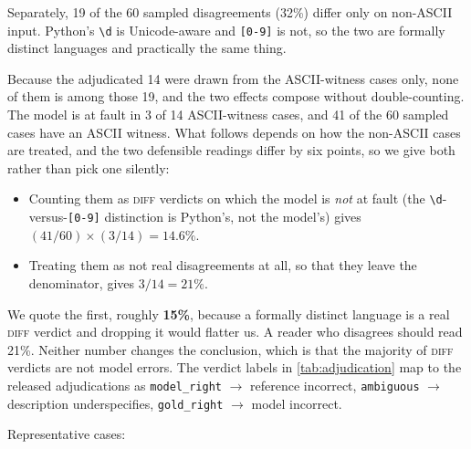 \documentclass[11pt]{article}
\begin{document}
Separately, 19 of the 60 sampled disagreements (32\%) differ only on
non-ASCII input. Python's \texttt{\textbackslash d} is Unicode-aware and
\texttt{[0-9]} is not, so the two are formally distinct languages and
practically the same thing.

Because the adjudicated 14 were drawn from the ASCII-witness cases only, none
of them is among those 19, and the two effects compose without
double-counting. The model is at fault in 3 of 14 ASCII-witness cases, and 41
of the 60 sampled cases have an ASCII witness. What follows depends on how the
non-ASCII cases are treated, and the two defensible readings differ by six
points, so we give both rather than pick one silently:

\begin{itemize}
\item Counting them as \textsc{diff} verdicts on which the model is
\emph{not} at fault (the \texttt{\textbackslash d}-versus-\texttt{[0-9]}
distinction is Python's, not the model's) gives
$(41/60) \times (3/14) = 14.6\%$.
\item Treating them as not real disagreements at all, so that they leave the
denominator, gives $3/14 = 21\%$.
\end{itemize}

\noindent We quote the first, roughly \textbf{15\%}, because a formally
distinct language is a real \textsc{diff} verdict and dropping it would
flatter us. A reader who disagrees should read 21\%. Neither number changes
the conclusion, which is that the majority of \textsc{diff} verdicts are not
model errors. The verdict labels in \cref{tab:adjudication} map to
the released adjudications as \texttt{model\_right} $\to$ reference
incorrect, \texttt{ambiguous} $\to$ description underspecifies,
\texttt{gold\_right} $\to$ model incorrect.

Representative cases:
\end{document}
